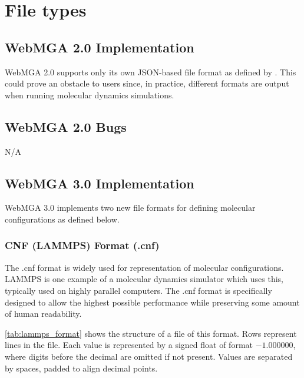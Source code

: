 \section{File types}
\subsection{WebMGA 2.0 Implementation}
WebMGA 2.0 supports only its own JSON-based file format as defined by \citeauthor{Battistini_2021}. This could prove an obstacle to users since, in practice, different formats are output when running molecular dynamics simulations.

\subsection{WebMGA 2.0 Bugs}
N/A

\subsection{WebMGA 3.0 Implementation}
WebMGA 3.0 implements two new file formats for defining molecular configurations as defined below.
\subsubsection{CNF (LAMMPS) Format (.cnf)}
The .cnf format is widely used for representation of molecular configurations. LAMMPS is one example of a molecular dynamics simulator which uses this, typically used on highly parallel computers\cite{thompson2022lammps}. The .cnf format is specifically designed to allow the highest possible performance while preserving some amount of human readability.

\cref{tab:lammps_format} shows the structure of a file of this format. Rows represent lines in the file. Each value is represented by a signed float of format $-1.000000 $, where digits before the decimal are omitted if not present. Values are separated by spaces, padded to align decimal points.

